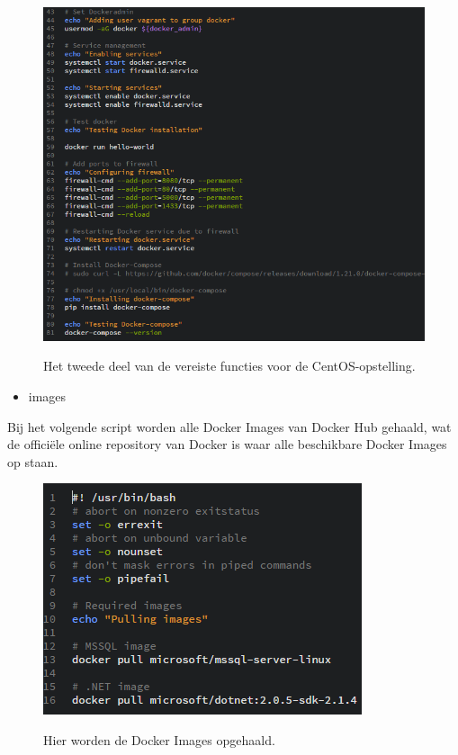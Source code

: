 \begin{figure}
	\centering
	\caption{Het tweede deel van de vereiste functies voor de CentOS-opstelling.}
	\includegraphics[scale=0.6]{img/centosprereq02}
	\label{centosprereq02}
\end{figure}

\begin{itemize}[noitemsep]
	\item images
\end{itemize}

Bij het volgende script worden alle Docker Images van Docker Hub gehaald, wat de officiële online repository van Docker is waar alle beschikbare Docker Images op staan.

\begin{figure}
	\centering
	\caption{Hier worden de Docker Images opgehaald.}
	\includegraphics[scale=0.6]{img/centosimages01}
	\label{centosimages}
\end{figure}

